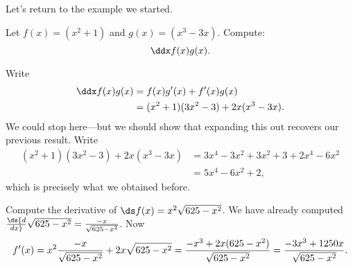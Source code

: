 Let's return to the example we started.
\begin{example} 
Let $f(x)=(x^2+1)$ and $g(x)=(x^3-3x)$. Compute:
\[
\ddx f(x)g(x).
\]
\end{example}
\begin{solution}
Write
\begin{align*}
\ddx f(x)g(x) &= f(x)g'(x) + f'(x)g(x)\\
&=(x^2+1)(3x^2-3) + 2x(x^3-3x).
\end{align*}
We could stop here---but we should show that expanding this out recovers our previous result. Write
\begin{align*}
(x^2+1)(3x^2-3) + 2x(x^3-3x) &= 3x^4-3x^2 +3x^2 +3 + 2x^4-6x^2\\
&=5x^4-6x^2+2,
\end{align*}
which is precisely what we obtained before.
\end{solution}


\begin{example} Compute the derivative of $\ds f(x)=x^2\sqrt{625-x^2}$.  We have
already computed $\ds {d\over
  dx}\sqrt{625-x^2}={-x\over\sqrt{625-x^2}}$.  Now
$$f'(x)=x^2{-x\over\sqrt{625-x^2}}+2x\sqrt{625-x^2}=
{-x^3+2x(625-x^2)\over \sqrt{625-x^2}}=
{-3x^3+1250x\over \sqrt{625-x^2}}.
$$
\end{example}

